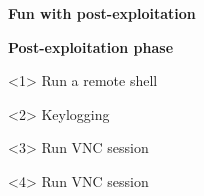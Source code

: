 {
\begin{frame}[plain]
    \begin{center}
      \Huge\bfseries
      Fun with post-exploitation
    \end{center}
\end{frame}
}

{
\begin{frame}[plain]
  \begin{center}
    \LARGE\bfseries
    Post-exploitation phase
  \end{center}

  \vspace{.5cm}

  \begin{onlyenv}<1>
    Run a remote shell
    \begin{center}
    \end{center}
  \end{onlyenv}

  \begin{onlyenv}<2>
    Keylogging
    \begin{center}
    \end{center}
  \end{onlyenv}


  \begin{onlyenv}<3>
    Run VNC session
    \begin{center}
    \end{center}
  \end{onlyenv}

  \begin{onlyenv}<4>
    Run VNC session
    \begin{center}
    \end{center}
  \end{onlyenv}

\end{frame}
}


